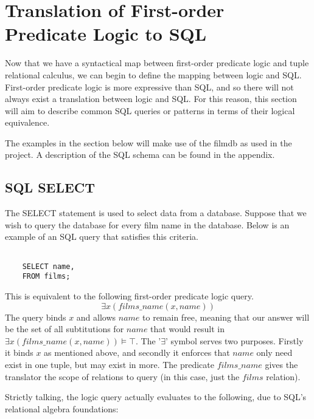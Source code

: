 \documentclass[a4paper, 11pt]{article}
\begin{document}
  \section{Translation of First-order Predicate Logic to SQL}

    Now that we have a syntactical map between first-order predicate logic and
    tuple relational calculus, we can begin to define the mapping between logic
    and SQL. First-order predicate logic
    is more expressive than SQL, and so there will not always exist a
    translation between logic and SQL. For this reason, this section will aim
    to describe common SQL queries or patterns in terms of their logical
    equivalence.

    The examples in the section below will make use of the filmdb as used in
    the project. A description of the SQL schema can be found in the appendix.

    \subsection{SQL SELECT}

    The SELECT statement is used to select data from a database.\cite{w3SELECT}
    Suppose that we wish to query the database for every film name in the
    database. Below is an example of an SQL query that satisfies this criteria.

    \begin{lstlisting}

    SELECT name,
    FROM films;

    \end{lstlisting}

    This is equivalent to the following first-order predicate logic query.
    \[
      \exists x(films\_name(x, name))
    \]
    The query binds $x$ and allows $name$ to remain free, meaning that our
    answer will be the set of all subtitutions for $name$ that would result in
    $\exists x(films\_name(x, name)) \models \top$. The '$\exists$' symbol
    serves two purposes. Firstly it binds $x$ as mentioned above, and secondly
    it enforces that $name$ only need exist in one tuple, but may exist in
    more. The predicate $films\_name$ gives the translator the scope of
    relations to query (in this case, just the $films$ relation).

    Strictly talking, the logic query actually evaluates to the following, due
    to SQL's relational algebra foundations:
\end{document}
